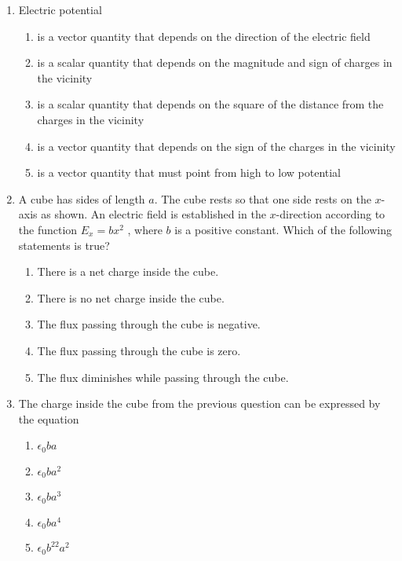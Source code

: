\documentclass{../../oss-apphys}
\begin{document}
\begin{multicols}{2}
\begin{enumerate}[leftmargin=18pt]
  \item Electric potential
    \begin{enumerate}[noitemsep,topsep=0pt,leftmargin=18pt,label=(\Alph*)]
    \item is a vector quantity that depends on the direction of the electric
      field
    \item is a scalar quantity that depends on the magnitude and sign of charges
      in the vicinity
    \item is a scalar quantity that depends on the square of the distance from
      the charges in the vicinity
    \item is a vector quantity that depends on the sign of the charges in the
      vicinity
    \item is a vector quantity that must point from high to low potential
    \end{enumerate}

  \item A cube has sides of length $a$. The cube rests so that one side rests on
    the $x$-axis as shown. An electric field is established in the $x$-direction
    according to the function $E_x=bx^2$ , where $b$ is a positive constant.
    Which of the following statements is true?
    \begin{center}
      \vspace{-.15in}
    \end{center}
    \begin{enumerate}[noitemsep,topsep=0pt,leftmargin=18pt,label=(\Alph*)]
    \item\vspace{-.2in}There is a net charge inside the cube.
    \item There is no net charge inside the cube.
    \item The flux passing through the cube is negative.
    \item The flux passing through the cube is zero.
    \item The flux diminishes while passing through the cube.
    \end{enumerate}

  \item The charge inside the cube from the previous question can be expressed
    by the equation
    \begin{enumerate}[noitemsep,topsep=0pt,leftmargin=18pt,label=(\Alph*)]
    \item $\epsilon_0ba$
    \item $\epsilon_0ba^2$
    \item $\epsilon_0ba^3$
    \item $\epsilon_0ba^4$
    \item $\epsilon_0b^22a^2$
    \end{enumerate}


\end{enumerate}
\end{multicols}
\end{document}
